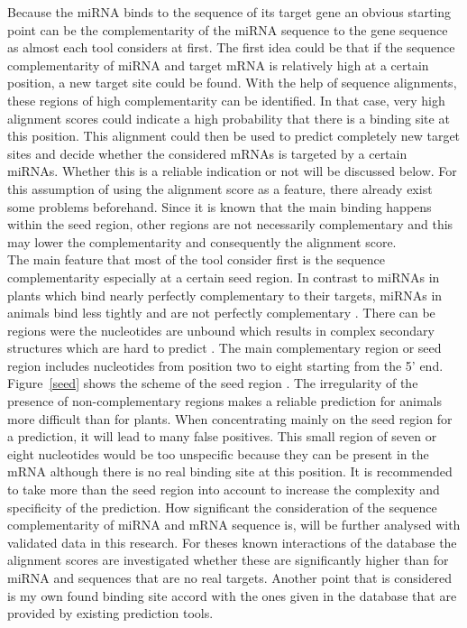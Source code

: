 \documentclass[12pt]{article}
\begin{document}
Because the miRNA binds to the sequence of its target gene an obvious starting point can be the complementarity of the miRNA sequence to the gene sequence as almost each tool considers at first. The first idea could be that if the sequence complementarity of miRNA and target mRNA is relatively high at a certain position, a new target site could be found. With the help of sequence alignments, these regions of high complementarity can be identified. In that case, very high alignment scores could indicate a high probability that there is a binding site at this position. This alignment could then be used to predict completely new target sites and decide whether the considered mRNAs is targeted by a certain miRNAs. Whether this is a reliable indication or not will be discussed below. For this assumption of using the alignment score as a feature, there already exist some problems beforehand. Since it is known that the main binding happens within the seed region, other regions are not necessarily complementary and this may lower the complementarity and consequently the alignment score. \\

The main feature that most of the tool consider first is the sequence complementarity especially at a certain seed region. In contrast to miRNAs in plants which bind nearly perfectly complementary to their targets, miRNAs in animals bind less tightly and are not perfectly complementary \cite{Rhoades}. There can be regions were the nucleotides are unbound which results in complex secondary structures which are hard to predict \cite{Rehmsmeier}. The main complementary region or seed region includes nucleotides from position two to eight starting from the 5' end. Figure~\ref{seed} shows the scheme of the seed region \cite{Peterson}. 
The irregularity of the presence of non-complementary regions makes a reliable prediction for animals more difficult than for plants. When concentrating mainly on the seed region for a prediction, it will lead to many false positives. This small region of seven or eight nucleotides would be too unspecific because they can be present in the mRNA although there is no real binding site at this position. It is recommended to take more than the seed region into account to increase the complexity and specificity of the prediction. How significant the consideration of the sequence complementarity of miRNA and mRNA sequence is, will be further analysed with validated data in this research. For theses known interactions of the database the alignment scores are investigated whether these are significantly higher than for miRNA and sequences that are no real targets. Another point that is considered is my own found binding site accord with the ones given in the database that are provided by existing prediction tools. \\\\
\end{document}
